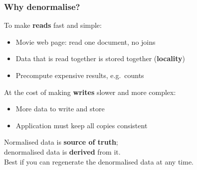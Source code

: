 \begin{frame}
    \label{s:why-denormalise}
    \frametitle{Why denormalise?}
    To make \textbf{reads} fast and simple:
    \begin{itemize}
        \item Movie web page: read one document, no joins
        \item Data that is read together is stored together (\textbf{locality})
        \item Precompute expensive results, e.g.\ counts\\[1em]\pause
    \end{itemize}
    At the cost of making \textbf{writes} slower and more complex:
    \begin{itemize}
        \item More data to write and store
        \item Application must keep all copies consistent\\[1em]\pause
    \end{itemize}
    Normalised data is \textbf{source of truth};\\
    denormalised data is \textbf{derived} from it.\\[0.5em]
    Best if you can regenerate the denormalised data at any time.
\end{frame}
\label{l:why-denormalise}

